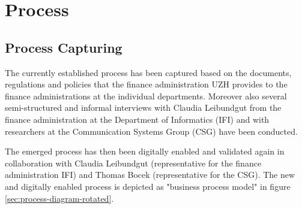 \chapter{Process}

\section{Process Capturing}
The currently established process has been captured based on the documents, regulations and policies that the finance administration UZH provides to the finance administrations at the individual departments. Moreover also several semi-structured and informal interviews with Claudia Leibundgut from the finance administration at the Department of Informatics (IFI) and with researchers at the Communication Systems Group (CSG) have been conducted.\par
The emerged process has then been digitally enabled and validated again in collaboration with Claudia Leibundgut (representative for the finance administration IFI) and Thomas Bocek (representative for the CSG). The new and digitally enabled process is depicted as "business process model"\cite{bpmn} in figure \ref{sec:process-diagram-rotated}.

